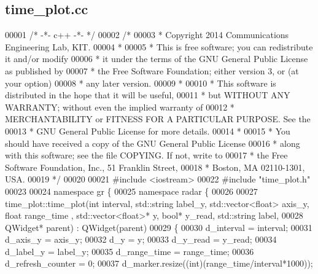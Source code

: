\subsection{time\+\_\+plot.\+cc}
\label{time__plot_8cc_source}

\begin{DoxyCode}
00001 \textcolor{comment}{/* -*- c++ -*- */}
00002 \textcolor{comment}{/* }
00003 \textcolor{comment}{ * Copyright 2014 Communications Engineering Lab, KIT.}
00004 \textcolor{comment}{ * }
00005 \textcolor{comment}{ * This is free software; you can redistribute it and/or modify}
00006 \textcolor{comment}{ * it under the terms of the GNU General Public License as published by}
00007 \textcolor{comment}{ * the Free Software Foundation; either version 3, or (at your option)}
00008 \textcolor{comment}{ * any later version.}
00009 \textcolor{comment}{ * }
00010 \textcolor{comment}{ * This software is distributed in the hope that it will be useful,}
00011 \textcolor{comment}{ * but WITHOUT ANY WARRANTY; without even the implied warranty of}
00012 \textcolor{comment}{ * MERCHANTABILITY or FITNESS FOR A PARTICULAR PURPOSE.  See the}
00013 \textcolor{comment}{ * GNU General Public License for more details.}
00014 \textcolor{comment}{ * }
00015 \textcolor{comment}{ * You should have received a copy of the GNU General Public License}
00016 \textcolor{comment}{ * along with this software; see the file COPYING.  If not, write to}
00017 \textcolor{comment}{ * the Free Software Foundation, Inc., 51 Franklin Street,}
00018 \textcolor{comment}{ * Boston, MA 02110-1301, USA.}
00019 \textcolor{comment}{ */}
00020 
00021 \textcolor{preprocessor}{#include <iostream>}
00022 \textcolor{preprocessor}{#include "time_plot.h"}
00023 
00024 \textcolor{keyword}{namespace }gr \{
00025     \textcolor{keyword}{namespace }radar \{
00026 
00027         time_plot::time_plot(\textcolor{keywordtype}{int} interval, std::string label\_y, std::vector<float> axis\_y, \textcolor{keywordtype}{float} range\_time
      , std::vector<float>* y, \textcolor{keywordtype}{bool}* y\_read, std::string label,
00028         QWidget* parent) : QWidget(parent)
00029         \{
00030             d_interval = interval;
00031             d_axis_y = axis\_y;
00032             d_y = y;
00033             d_y_read = y\_read;
00034             d_label_y = label\_y;
00035             d_range_time = range\_time;
00036             d_refresh_counter = 0;
00037             d_marker.resize((\textcolor{keywordtype}{int})(range\_time/interval*1000));

\end{DoxyCode}
